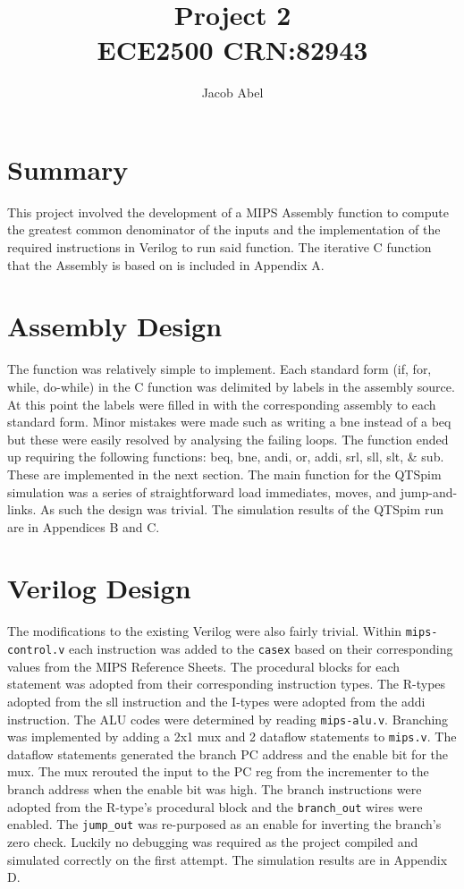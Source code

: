 \documentclass[12pt,letterpaper,titlepage]{article}
\author{Jacob Abel}
\title{	Project 2
	\\\large ECE2500 CRN:82943
}
\begin{document}
\maketitle
\begin{raggedright}

\section{Summary}
This project involved the development of a MIPS Assembly function to compute the greatest common denominator of the inputs and the implementation of the required instructions in Verilog to run said function. The iterative C function that the Assembly is based on is included in Appendix A.

\section{Assembly Design}
The function was relatively simple to implement. Each standard form (if, for, while, do-while) in the C function was delimited by labels in the assembly source. At this point the labels were filled in with the corresponding assembly to each standard form. Minor mistakes were made such as writing a bne instead of a beq but these were easily resolved by analysing the failing loops. The function ended up requiring the following functions: beq, bne, andi, or, addi, srl, sll, slt, \& sub. These are implemented in the next section. The main function for the QTSpim simulation was a series of straightforward load immediates, moves, and jump-and-links. As such the design was trivial. The simulation results of the QTSpim run are in Appendices B and C. 

\section{Verilog Design}
The modifications to the existing Verilog were also fairly trivial. Within \texttt{mips-control.v} each instruction was added to the \texttt{casex} based on their corresponding values from the MIPS Reference Sheets. The procedural blocks for each statement was adopted from their corresponding instruction types. The R-types adopted from the sll instruction and the I-types were adopted from the addi instruction. The ALU codes were determined by reading \texttt{mips-alu.v}. Branching was implemented by adding a 2x1 mux and 2 dataflow statements to \texttt{mips.v}. The dataflow statements generated the branch PC address and the enable bit for the mux. The mux rerouted the input to the PC reg from the incrementer to the branch address when the enable bit was high. The branch instructions were adopted from the R-type's procedural block and the \texttt{branch\_out} wires were enabled. The \texttt{jump\_out} was re-purposed as an enable for inverting the branch's zero check. Luckily no debugging was required as the project compiled and simulated correctly on the first attempt. The simulation results are in Appendix D.


\end{raggedright}
\end{document}
